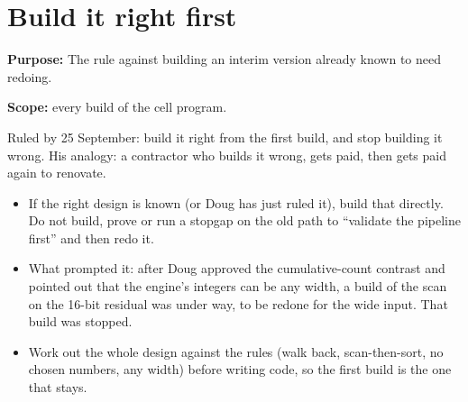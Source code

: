 \chapter{\texorpdfstring{Build it right first}{Build it right first}}
\label{chap:build-right-first}

\textbf{Purpose:} The rule against building an interim version already known to need redoing.

\textbf{Scope:} every build of the cell program.

Ruled by 25 September: build it right from the first build, and stop building it wrong. His analogy: a contractor who builds it wrong, gets paid, then gets paid again to renovate.

\begin{itemize}
\item If the right design is known (or Doug has just ruled it), build that directly. Do not build, prove or run a stopgap on the old path to “validate the pipeline first” and then redo it.
\item What prompted it: after Doug approved the cumulative-count contrast and pointed out that the engine's integers can be any width, a build of the scan on the 16-bit residual was under way, to be redone for the wide input. That build was stopped.
\item Work out the whole design against the rules (walk back, scan-then-sort, no chosen numbers, any width) before writing code, so the first build is the one that stays.
\end{itemize}
